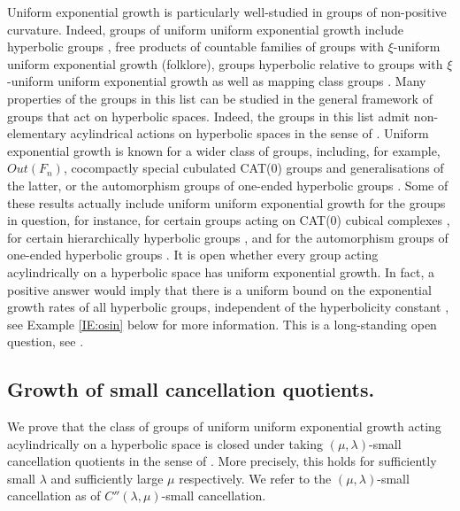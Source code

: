 \documentclass[leqno,a4paper,10pt]{amsart}
\theoremstyle{plain}
\theoremstyle{definition}
\theoremstyle{remark}
\begin{document}
Uniform exponential growth is particularly well-studied in groups of non-positive curvature. Indeed, groups of uniform uniform exponential growth include hyperbolic groups \cite{koubi_croissance_1998,arzhantseva_lower_2006,breuillard_joint_2021,besson_curvaturefree_2020}, free products of countable families of groups with $\xi$-uniform uniform exponential growth (folklore), groups hyperbolic relative to groups with $\xi$-uniform uniform exponential growth \cite{cui_lower_2022,kropholler_extensions_2020} as well as mapping class groups \cite{anderson_uniformly_2007,mangahas_uniform_2010}. Many properties of the groups in this list can be studied in the general framework of groups that act on hyperbolic spaces. Indeed, the groups in this list admit non-elementary acylindrical actions on hyperbolic spaces in the sense of  \cite{sela_acylindrical_1997,bowditch_tight_2008,dahmani_hyperbolically_2017}.  Uniform exponential growth is known for a wider class of groups, including, for example,  $Out(F_n)$, cocompactly special cubulated CAT(0) groups and generalisations of the latter, or the automorphism groups of one-ended hyperbolic groups  \cite{eskin_uniform_2005,anderson_uniformly_2007,gupta_groups_2023,abbott_hierarchically_2019,zalloum_effective_2023,wan_uniform_2025,kropholler_extensions_2020}. Some of these results actually include uniform uniform exponential growth for the groups in question, for instance, for certain groups acting on CAT(0) cubical complexes \cite{gupta_groups_2023}, for certain hierarchically hyperbolic groups \cite{wan_uniform_2025}, and  for the automorphism groups of one-ended hyperbolic groups \cite{kropholler_extensions_2020}. 
 It is open whether every group acting acylindrically on a hyperbolic space has uniform exponential growth. In fact, a positive answer would imply that there is a uniform bound on the exponential growth rates of all hyperbolic groups, independent of the hyperbolicity constant \cite{minasyan_acylindrically_2019}, see Example \ref{IE:osin} below for more information. This is a long-standing open question, see \cite[Question~2.1]{osin_algebraic_2004}\cite[Section~14, Question~2]{breuillard_joint_2021}. 

\subsection{Growth of small cancellation quotients.}

We prove that the class of groups of uniform uniform exponential growth acting acylindrically on a hyperbolic space is closed under taking $(\mu,\lambda)$-small cancellation quotients in the sense of \cite[Definition~6.25]{dahmani_hyperbolically_2017}. More precisely, this holds for sufficiently small  
 $\lambda$ and sufficiently large $\mu$ respectively. We refer to the $(\mu,\lambda)$-small cancellation as of $C''(\lambda,\mu)$-small cancellation.  
 
\end{document}

